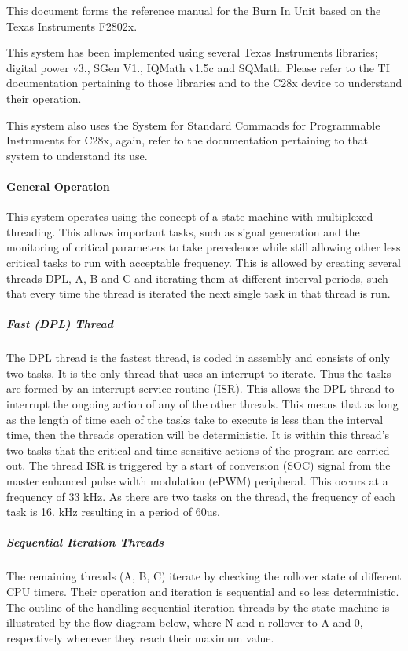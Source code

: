 This document forms the reference manual for the Burn In Unit based on the Texas Instruments F2802x.

This system has been implemented using several Texas Instruments libraries; digital power v3., S\-Gen V1., I\-Q\-Math v1.\-5c and S\-Q\-Math. Please refer to the T\-I documentation pertaining to those libraries and to the C28x device to understand their operation.

This system also uses the System for Standard Commands for Programmable Instruments for C28x, again, refer to the documentation pertaining to that system to understand its use.

\paragraph*{General Operation}

This system operates using the concept of a state machine with multiplexed threading. This allows important tasks, such as signal generation and the monitoring of critical parameters to take precedence while still allowing other less critical tasks to run with acceptable frequency. This is allowed by creating several threads D\-P\-L, A, B and C and iterating them at different interval periods, such that every time the thread is iterated the next single task in that thread is run.

\subparagraph*{Fast (D\-P\-L) Thread}

The D\-P\-L thread is the fastest thread, is coded in assembly and consists of only two tasks. It is the only thread that uses an interrupt to iterate. Thus the tasks are formed by an interrupt service routine (I\-S\-R). This allows the D\-P\-L thread to interrupt the ongoing action of any of the other threads. This means that as long as the length of time each of the tasks take to execute is less than the interval time, then the threads operation will be deterministic. It is within this thread's two tasks that the critical and time-\/sensitive actions of the program are carried out. The thread I\-S\-R is triggered by a start of conversion (S\-O\-C) signal from the master enhanced pulse width modulation (e\-P\-W\-M) peripheral. This occurs at a frequency of 33 k\-Hz. As there are two tasks on the thread, the frequency of each task is 16. k\-Hz resulting in a period of 60us.

\subparagraph*{Sequential Iteration Threads}

The remaining threads (A, B, C) iterate by checking the rollover state of different C\-P\-U timers. Their operation and iteration is sequential and so less deterministic. The outline of the handling sequential iteration threads by the state machine is illustrated by the flow diagram below, where N and n rollover to A and 0, respectively whenever they reach their maximum value.



